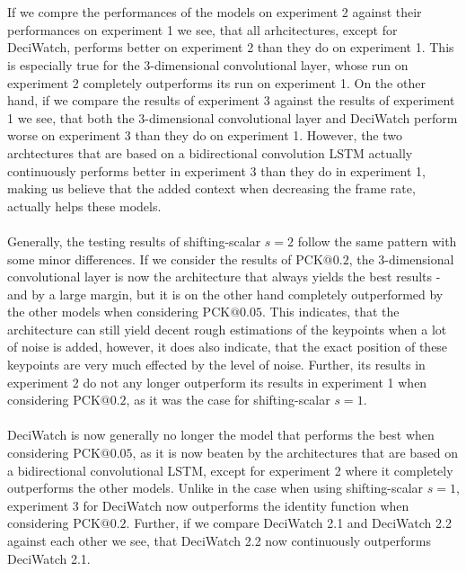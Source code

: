 \documentclass[./main.tex]{subfiles}
\begin{document}
\\
\\
If we compre the performances of the models on experiment 2 against their performances on experiment 1 we see, that all arhcitectures, except for DeciWatch, performs better on experiment 2 than they do on experiment 1. This is especially true for the 3-dimensional convolutional layer, whose run on experiment 2 completely outperforms its run on experiment 1. On the other hand, if we compare the results of experiment 3 against the results of experiment 1 we see, that both the 3-dimensional convolutional layer and DeciWatch perform worse on experiment 3 than they do on experiment 1. However, the two archtectures that are based on a bidirectional convolution LSTM actually continuously performs better in experiment 3 than they do in experiment 1, making us believe that the added context when decreasing the frame rate, actually helps these models.
\\
\\
Generally, the testing results of shifting-scalar $s = 2$ follow the same pattern with some minor differences. If we consider the results of PCK$@0.2$, the 3-dimensional convolutional layer is now the architecture that always yields the best results - and by a large margin, but it is on the other hand completely outperformed by the other models when considering PCK$@0.05$. This indicates, that the architecture can still yield decent rough estimations of the keypoints when a lot of noise is added, however, it does also indicate, that the exact position of these keypoints are very much effected by the level of noise. Further, its results in experiment 2 do not any longer outperform its results in experiment 1 when considering PCK$@0.2$, as it was the case for shifting-scalar $s = 1$.
\\
\\
DeciWatch is now generally no longer the model that performs the best when considering PCK$@0.05$, as it is now beaten by the architectures that are based on a bidirectional convolutional LSTM, except for experiment 2 where it completely outperforms the other models. Unlike in the case when using shifting-scalar $s = 1$, experiment 3 for DeciWatch now outperforms the identity function when considering PCK$@0.2$. Further, if we compare DeciWatch 2.1 and DeciWatch 2.2 against each other we see, that DeciWatch 2.2 now continuously outperforms DeciWatch 2.1.
\end{document}
